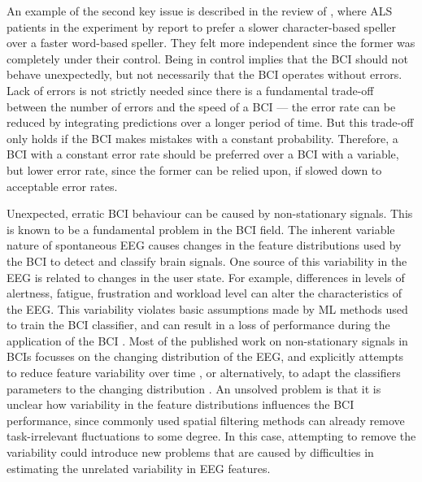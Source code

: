 An example of the second key issue is described in the review of
\citet{wolpaw2002bci}, where \ac{ALS} patients in the experiment by
\citet{kuebler1999ttd} report to prefer a slower character-based speller over a
faster word-based speller. They felt more independent since the former was
completely under their control. 
%
Being in control implies that the \ac{BCI} should not behave unexpectedly,
but not necessarily that the \ac{BCI} operates without errors. Lack of errors
is not strictly needed since there is a fundamental trade-off between the
number of errors and the speed of a \ac{BCI} --- the error rate can be reduced
by integrating predictions over a longer period of time. But this trade-off
only holds if the BCI makes mistakes with a constant probability. Therefore, a
\ac{BCI} with a constant error rate should be preferred over a \ac{BCI} with a
variable, but lower error rate, since the former can be relied upon, if slowed
down to acceptable error rates.

Unexpected, erratic \ac{BCI} behaviour can be caused by non-stationary signals.
This is known to be a fundamental problem in the \ac{BCI} field. The inherent
variable nature of spontaneous \ac{EEG} causes changes in the feature
distributions used by the \ac{BCI} to detect and classify brain signals. 
%
One source of this variability in the \ac{EEG} is related to changes in the
user state. For example, differences in levels of alertness, fatigue,
frustration and workload level can alter the characteristics of the \ac{EEG}.
This variability violates basic assumptions made by \ac{ML} methods used to
train the \ac{BCI} classifier, and can result in a loss of performance during
the application of the \ac{BCI} \cite{shenoy2006tac, blankertz2007ics,
krauledat2008tzt}. 
%
Most of the published work on non-stationary signals in \acp{BCI} focusses on
the changing distribution of the \ac{EEG}, and explicitly attempts to reduce
feature variability over time \cite{hill2006tdd, tomioka2006asf,
blankertz2007ics, bunau2009ssa, meinecke2009lis}, or alternatively, to adapt
the classifiers parameters to the changing distribution \cite{shenoy2006tac,
vidaurre2007sol}.
%
An unsolved problem is that it is unclear how variability in the feature
distributions influences the \ac{BCI} performance, since commonly used spatial
filtering methods can already remove task-irrelevant fluctuations to some
degree. In this case, attempting to remove the variability could introduce new
problems that are caused by difficulties in estimating the unrelated
variability in \ac{EEG} features.

